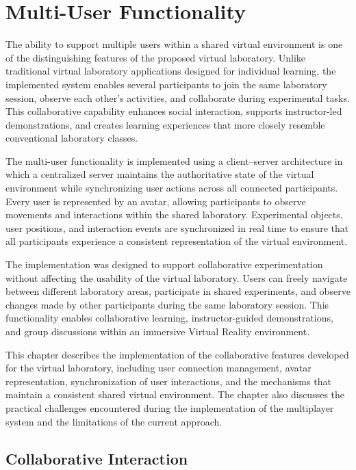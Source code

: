 \chapter{Multi-User Functionality}

The ability to support multiple users within a shared virtual environment is one of the distinguishing features of the proposed virtual laboratory. Unlike traditional virtual laboratory applications designed for individual learning, the implemented system enables several participants to join the same laboratory session, observe each other's activities, and collaborate during experimental tasks. This collaborative capability enhances social interaction, supports instructor-led demonstrations, and creates learning experiences that more closely resemble conventional laboratory classes.

The multi-user functionality is implemented using a client--server architecture in which a centralized server maintains the authoritative state of the virtual environment while synchronizing user actions across all connected participants. Every user is represented by an avatar, allowing participants to observe movements and interactions within the shared laboratory. Experimental objects, user positions, and interaction events are synchronized in real time to ensure that all participants experience a consistent representation of the virtual environment.

The implementation was designed to support collaborative experimentation without affecting the usability of the virtual laboratory. Users can freely navigate between different laboratory areas, participate in shared experiments, and observe changes made by other participants during the same laboratory session. This functionality enables collaborative learning, instructor-guided demonstrations, and group discussions within an immersive Virtual Reality environment.

This chapter describes the implementation of the collaborative features developed for the virtual laboratory, including user connection management, avatar representation, synchronization of user interactions, and the mechanisms that maintain a consistent shared virtual environment. The chapter also discusses the practical challenges encountered during the implementation of the multiplayer system and the limitations of the current approach.

\section{Collaborative Interaction}

